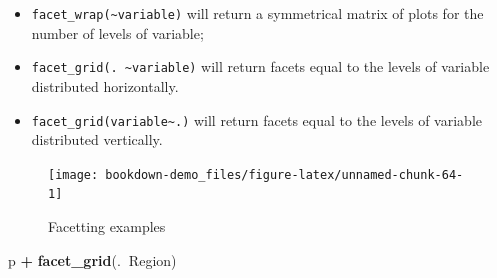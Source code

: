 \documentclass[]{book}
\newenvironment{Shaded}{\begin{snugshade}}{\end{snugshade}}
\newcommand{\KeywordTok}[1]{\textcolor[rgb]{0.13,0.29,0.53}{\textbf{#1}}}
\newcommand{\DataTypeTok}[1]{\textcolor[rgb]{0.13,0.29,0.53}{#1}}
\newcommand{\DecValTok}[1]{\textcolor[rgb]{0.00,0.00,0.81}{#1}}
\newcommand{\StringTok}[1]{\textcolor[rgb]{0.31,0.60,0.02}{#1}}
\newcommand{\OtherTok}[1]{\textcolor[rgb]{0.56,0.35,0.01}{#1}}
\newcommand{\OperatorTok}[1]{\textcolor[rgb]{0.81,0.36,0.00}{\textbf{#1}}}
\newcommand{\NormalTok}[1]{#1}
\begin{document}
\begin{itemize}
\item
  \texttt{facet\_wrap(\textasciitilde{}variable)} will return a
  symmetrical matrix of plots for the number of levels of variable;
\item
  \texttt{facet\_grid(.\ \textasciitilde{}variable)} will return facets
  equal to the levels of variable distributed horizontally.
\item
  \texttt{facet\_grid(variable\textasciitilde{}.)} will return facets
  equal to the levels of variable distributed vertically.
\end{itemize}

\begin{Shaded}
\end{Shaded}

\begin{figure}

{\centering \texttt{[image: bookdown-demo\_files/figure-latex/unnamed-chunk-64-1]} 

}

\caption{Facetting examples}\label{fig:unnamed-chunk-64-1}
\end{figure}

\begin{Shaded}
\begin{Highlighting}[]
\NormalTok{p }\OperatorTok{+}\StringTok{ }\KeywordTok{facet_grid}\NormalTok{(.}\OperatorTok{~}\NormalTok{Region)}
\end{Highlighting}
\end{Shaded}
\end{document}

